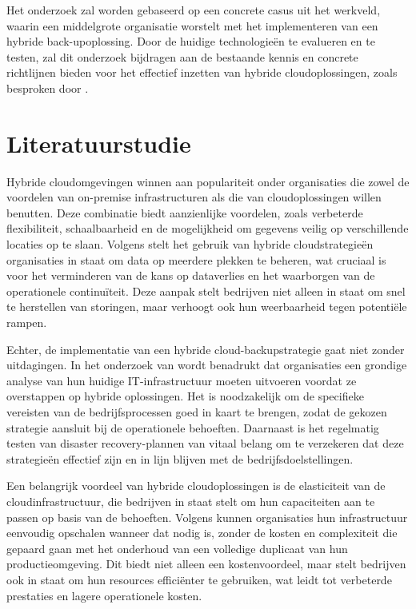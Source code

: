 Het onderzoek zal worden gebaseerd op een concrete casus uit het werkveld, waarin een middelgrote organisatie worstelt met het implementeren van een hybride back-upoplossing. Door de huidige technologieën te evalueren en te testen, zal dit onderzoek bijdragen aan de bestaande kennis en concrete richtlijnen bieden voor het effectief inzetten van hybride cloudoplossingen, zoals besproken door \textcite{ARASET48PP100_116}.
​
\section{Literatuurstudie}%
\label{sec}

Hybride cloudomgevingen winnen aan populariteit onder organisaties die zowel de voordelen van on-premise infrastructuren als die van cloudoplossingen willen benutten. Deze combinatie biedt aanzienlijke voordelen, zoals verbeterde flexibiliteit, schaalbaarheid en de mogelijkheid om gegevens veilig op verschillende locaties op te slaan. Volgens \textcite{Yanamala2024} stelt het gebruik van hybride cloudstrategieën organisaties in staat om data op meerdere plekken te beheren, wat cruciaal is voor het verminderen van de kans op dataverlies en het waarborgen van de operationele continuïteit. Deze aanpak stelt bedrijven niet alleen in staat om snel te herstellen van storingen, maar verhoogt ook hun weerbaarheid tegen potentiële rampen.

Echter, de implementatie van een hybride cloud-backupstrategie gaat niet zonder uitdagingen. In het onderzoek van \textcite{ARASET48PP100_116} wordt benadrukt dat organisaties een grondige analyse van hun huidige IT-infrastructuur moeten uitvoeren voordat ze overstappen op hybride oplossingen. Het is noodzakelijk om de specifieke vereisten van de bedrijfsprocessen goed in kaart te brengen, zodat de gekozen strategie aansluit bij de operationele behoeften. Daarnaast is het regelmatig testen van disaster recovery-plannen van vitaal belang om te verzekeren dat deze strategieën effectief zijn en in lijn blijven met de bedrijfsdoelstellingen.

Een belangrijk voordeel van hybride cloudoplossingen is de elasticiteit van de cloudinfrastructuur, die bedrijven in staat stelt om hun capaciteiten aan te passen op basis van de behoeften. Volgens \textcite{VinayakBhuvi} kunnen organisaties hun infrastructuur eenvoudig opschalen wanneer dat nodig is, zonder de kosten en complexiteit die gepaard gaan met het onderhoud van een volledige duplicaat van hun productieomgeving. Dit biedt niet alleen een kostenvoordeel, maar stelt bedrijven ook in staat om hun resources efficiënter te gebruiken, wat leidt tot verbeterde prestaties en lagere operationele kosten.

